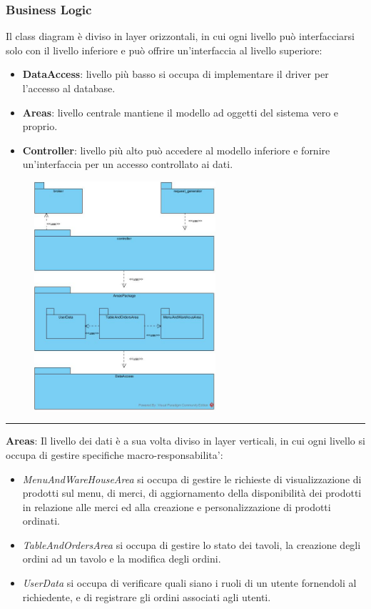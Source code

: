 \subsubsection{Business Logic}
Il class diagram è diviso in layer orizzontali, in cui ogni livello può interfacciarsi solo con il livello inferiore e può offrire un'interfaccia al livello superiore:
\begin{itemize}
	\item \textbf{DataAccess}: livello più basso si occupa di implementare il driver per l'accesso al database.
	\item \textbf{Areas}: livello centrale mantiene il modello ad oggetti del sistema vero e proprio.
	\item \textbf{Controller}: livello più alto può accedere al modello inferiore e fornire un'interfaccia per un accesso controllato ai dati.
\end{itemize}
\begin{figure}[H]
	\centering
	\includegraphics[width=0.6\textwidth]{Immagini/business_logic.jpg}
\end{figure}
\hrule
\vspace{0.5cm}
\textbf{Areas}:
Il livello dei dati è a sua volta diviso in layer verticali, in cui ogni livello si occupa di gestire specifiche macro-responsabilita':
\begin{itemize}
	\item \textit{MenuAndWareHouseArea} si occupa di gestire le richieste di visualizzazione di prodotti sul menu, di merci, di aggiornamento della disponibilità dei prodotti in relazione alle merci ed alla creazione e personalizzazione di prodotti ordinati.
	\item \textit{TableAndOrdersArea} si occupa di gestire lo stato dei tavoli, la creazione degli ordini ad un tavolo e la modifica degli ordini.
	\item \textit{UserData} si occupa di verificare quali siano i ruoli di un utente fornendoli al richiedente, e di registrare gli ordini associati agli utenti.
\end{itemize}
